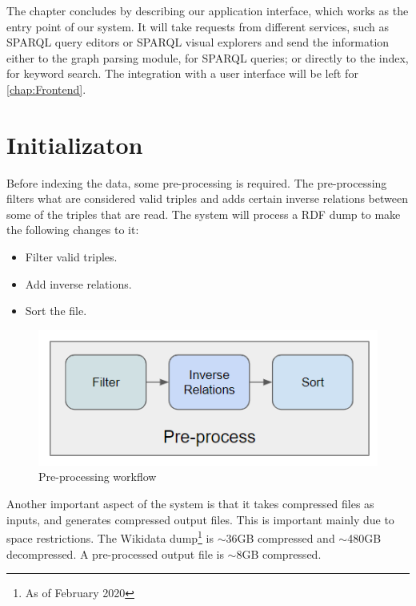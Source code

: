 The chapter concludes by describing our application interface, which works as the entry point of our system. 
It will take requests from different services, such as SPARQL query editors or SPARQL visual explorers and send the information either to the graph parsing module, for SPARQL queries; 
or directly to the index, for keyword search. 
The integration with a user interface will be left for \autoref{chap:Frontend}.


\section{Initializaton}
\label{chap:init}

Before indexing the data, some pre-processing is required. 
The pre-processing filters what are considered valid triples and adds certain inverse relations between some of the triples that are read. 
The system will process a RDF dump to make the following changes to it:
\begin{itemize}
    \item Filter valid triples.
    \item Add inverse relations.
    \item Sort the file.
\end{itemize}

\begin{figure}[H]
    \centering
        \includegraphics[width=0.5\linewidth]{imagenes/Preprocess.png}
        \caption{Pre-processing workflow}
        \label{fig:preprocess}
\end{figure}

Another important aspect of the system is that it takes compressed files as inputs, and generates compressed output files. 
This is important mainly due to space restrictions. 
The Wikidata dump\footnote{As of February 2020} is $\sim$36GB compressed and $\sim$480GB decompressed.
A pre-processed output file is $\sim$8GB compressed. 

